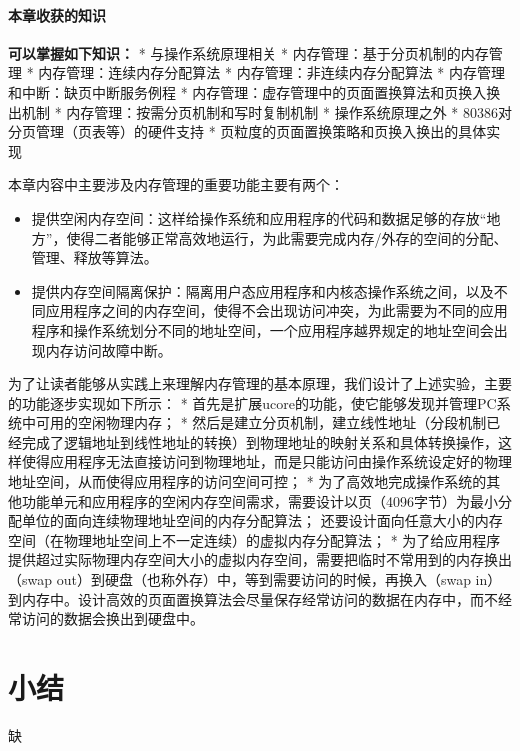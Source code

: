 \paragraph{本章收获的知识}

\textbf{可以掌握如下知识：} * 与操作系统原理相关 *
内存管理：基于分页机制的内存管理 * 内存管理：连续内存分配算法 *
内存管理：非连续内存分配算法 * 内存管理和中断：缺页中断服务例程 *
内存管理：虚存管理中的页面置换算法和页换入换出机制 *
内存管理：按需分页机制和写时复制机制 * 操作系统原理之外 *
80386对分页管理（页表等）的硬件支持 *
页粒度的页面置换策略和页换入换出的具体实现

本章内容中主要涉及内存管理的重要功能主要有两个：

\begin{itemize}
\item
  提供空闲内存空间：这样给操作系统和应用程序的代码和数据足够的存放``地方''，使得二者能够正常高效地运行，为此需要完成内存/外存的空间的分配、管理、释放等算法。
\item
  提供内存空间隔离保护：隔离用户态应用程序和内核态操作系统之间，以及不同应用程序之间的内存空间，使得不会出现访问冲突，为此需要为不同的应用程序和操作系统划分不同的地址空间，一个应用程序越界规定的地址空间会出现内存访问故障中断。
\end{itemize}

为了让读者能够从实践上来理解内存管理的基本原理，我们设计了上述实验，主要的功能逐步实现如下所示：
* 首先是扩展ucore的功能，使它能够发现并管理PC系统中可用的空闲物理内存；
*
然后是建立分页机制，建立线性地址（分段机制已经完成了逻辑地址到线性地址的转换）到物理地址的映射关系和具体转换操作，这样使得应用程序无法直接访问到物理地址，而是只能访问由操作系统设定好的物理地址空间，从而使得应用程序的访问空间可控；
*
为了高效地完成操作系统的其他功能单元和应用程序的空闲内存空间需求，需要设计以页（4096字节）为最小分配单位的面向连续物理地址空间的内存分配算法；
还要设计面向任意大小的内存空间（在物理地址空间上不一定连续）的虚拟内存分配算法；
*
为了给应用程序提供超过实际物理内存空间大小的虚拟内存空间，需要把临时不常用到的内存换出（swap
out）到硬盘（也称外存）中，等到需要访问的时候，再换入（swap
in）到内存中。设计高效的页面置换算法会尽量保存经常访问的数据在内存中，而不经常访问的数据会换出到硬盘中。












%
%
%
%
%
%
%

\section{小结}
缺

